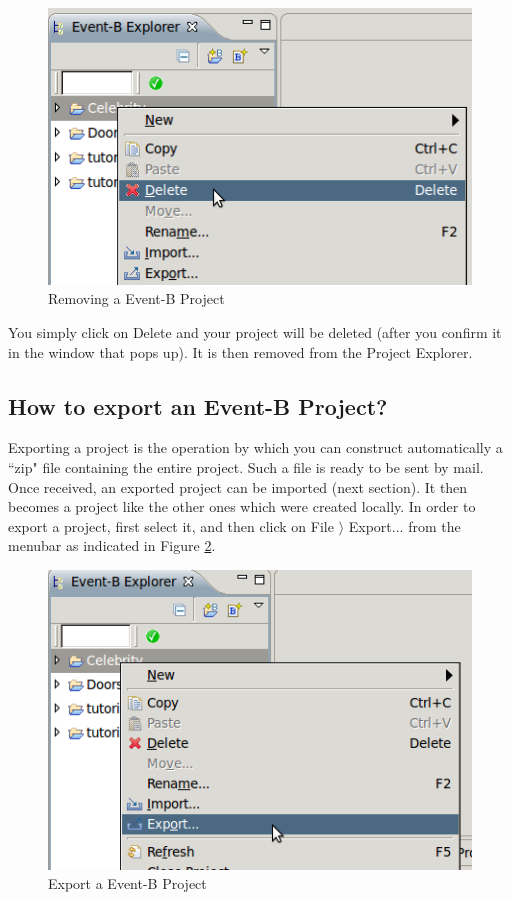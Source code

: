 \begin{figure}[!ht]
\begin{center}
	\includegraphics{img/faq/faq_removeproject.png}
	\caption{Removing a Event-B Project}
	\label{fig_faq_removeproject}
\end{center}
\end{figure}

You simply click on \textsf{Delete} and your project will be deleted (after you confirm it in the window that pops up). It is then removed from the \textsf{Project Explorer}.

\subsection{How to export an Event-B Project?}

Exporting a project is the operation by which you can construct automatically a ``zip" file containing the entire project. Such a file is ready to be sent by mail. Once received, an exported project can be imported (next section). It then becomes a project like the other ones which were created locally. In order to export a project, first select it, and then click on \textsf{File $\rangle$ Export...} from the menubar as indicated in Figure \ref{fig_faq_exportproject}. 

\begin{figure}[!ht]
\begin{center}
	\includegraphics{img/faq/faq_exportproject.png}
	\caption{Export a Event-B Project}
	\label{fig_faq_exportproject}
\end{center}
\end{figure}

